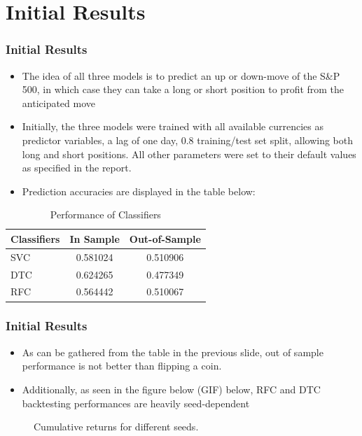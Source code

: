 \documentclass{beamer}
\begin{document}
\section{Initial Results}
\begin{frame}
\frametitle{Initial Results}
\begin{itemize}
\item The idea of all three models is to predict an up or down-move of the S\&P 500, in which case they can take a long or short position to profit from the anticipated move
\item Initially, the three models were trained with all available currencies as predictor variables, a lag of one day, 0.8 training/test set split, allowing both long and short positions. All other parameters were set to their default values as specified in the report.
\item Prediction accuracies are displayed in the table below:
\end{itemize}
\begin{table}[h]
  \centering
  \begin{tabular}{lcc}
    \hline
    Classifiers & In Sample & Out-of-Sample \\
    \hline
    SVC & 0.581024 & 0.510906 \\
    DTC & 0.624265 & 0.477349 \\
    RFC & 0.564442 & 0.510067 \\
    \hline
  \end{tabular}
  \caption{Performance of Classifiers}
  \label{tab: classifier_performance}
\end{table}
\end{frame}

\begin{frame}
\frametitle{Initial Results}
\begin{itemize}
\item As can be gathered from the table in the previous slide, out of sample performance is not better than flipping a coin. \item Additionally, as seen in the figure below (GIF) below, RFC and DTC backtesting performances are heavily seed-dependent
\end{itemize}
\begin{figure}[h!]
    \centering
    \caption{Cumulative returns for different seeds.}
    \label{fig: moving_returns}
\end{figure}

\end{frame}
\end{document}
